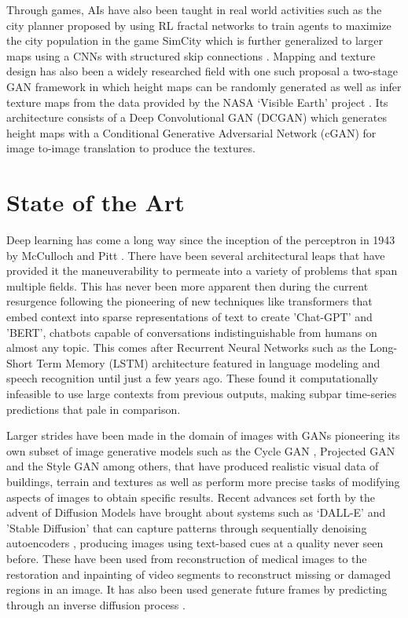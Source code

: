 \documentclass{Configuration_Files/PoliMi3i_thesis}
\begin{document}
Through games, AIs have also been taught in real world activities such as the city 
planner proposed by using RL fractal networks to train agents to maximize the city 
population in the game SimCity which is further generalized to larger maps using a 
CNNs with structured skip connections \cite{SaE20}. Mapping and texture design has 
also been a widely researched field with one such proposal a two-stage GAN framework in which height 
maps can be randomly generated as well as infer texture maps from the data 
provided by the NASA ‘Visible Earth’ project \cite{ChB17}. Its architecture consists of a Deep 
Convolutional GAN (DCGAN) which generates height maps with a Conditional Generative
Adversarial Network (cGAN) for image to-image translation to produce the textures. 

\section{State of the Art}
Deep learning has come a long way since the inception of the perceptron in 
1943 by McCulloch and Pitt \cite{WaM90}. There have been several architectural leaps 
that have provided it the maneuverability to permeate into a variety of problems that
span multiple fields. This has never been more apparent then during the current resurgence following 
the pioneering of new techniques like transformers \cite{AsV17} that embed context into sparse 
representations of text to create 'Chat-GPT' and 'BERT', chatbots capable of conversations indistinguishable 
from humans on almost any topic. This comes after Recurrent Neural Networks such as the Long-Short 
Term Memory (LSTM) architecture \cite{SeH97} featured in language modeling and speech recognition 
until just a few years ago. These found it computationally infeasible to use large contexts from previous 
outputs, making subpar time-series predictions \cite{AlZ19} that pale in comparison.

Larger strides have been made in the domain of images with GANs pioneering its own subset of 
image generative models such as the Cycle GAN \cite{JuZ17}, Projected GAN \cite{AxS21} and 
the Style GAN \cite{TeK19} among others, that have produced realistic visual data of buildings, terrain 
and textures \cite{ChB17,TiT11} as well as perform more precise tasks of modifying aspects of images to 
obtain specific results. Recent advances set forth by the advent of Diffusion Models have brought about 
systems such as ‘DALL-E’ and 'Stable Diffusion' that can capture patterns through sequentially denoising 
autoencoders \cite{RoR22}, producing images using text-based cues at a quality never seen before. These 
have been used from reconstruction of medical images to the restoration and inpainting of video segments to 
reconstruct missing or damaged regions in an image. It has also been used generate future frames by predicting 
through an inverse diffusion process \cite{LiY22}. 
\end{document}
